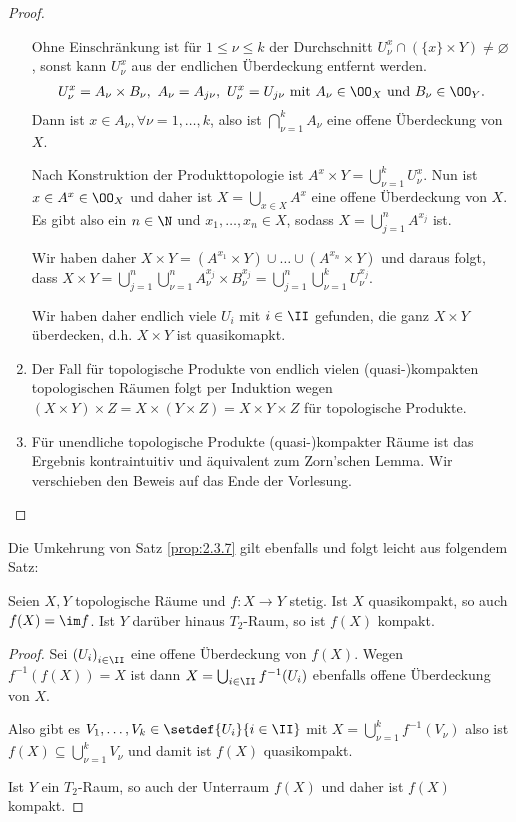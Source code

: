 \begin{proof}
\begin{enumerate}[label=\arabic{*}.)]
  Ohne Einschränkung ist für $1\le \nu\le k$ der Durchschnitt
  $U_\nu^x\cap\left(\{x\}\times Y\right)\neq\varnothing$, sonst kann $U_\nu^x$
  aus der endlichen Überdeckung entfernt werden.
\begin{align*}
U_\nu^x = A_\nu\times B_\nu,\
A_\nu = A_{j\nu},\ U_\nu^x = U_{j\nu}\text{ mit } A_\nu\in\OO_X \text{ und }B_\nu\in\OO_Y.
\end{align*}
  Dann ist $x\in A_\nu, \forall \nu=1,\ldots,k$, also ist $\bigcap_{\nu=1}^k
  A_\nu$ eine offene Überdeckung von $X$.
  
  Nach Konstruktion der Produkttopologie ist $A^x\times Y = \bigcup_{\nu=1}^k
  U_\nu^x$. Nun ist $x\in A^x\in\OO_X$ und daher ist $X=\bigcup_{x\in X} A^x$
  eine offene Überdeckung von $X$. Es gibt also ein $n\in\N$ und
  $x_1,\ldots,x_n\in X$, sodass $X=\bigcup_{j=1}^n A^{x_j}$ ist.
  
  Wir haben daher $X\times Y = \left(A^{x_1}\times Y\right) \cup \ldots\cup
  \left(A^{x_n}\times Y \right)$ und daraus folgt, dass
  $X\times Y = \bigcup_{j=1}^n\bigcup_{\nu=1}^n A_\nu^{x_j}\times B_\nu^{x_j} =
  \bigcup_{j=1}^n\bigcup_{\nu=1}^k U_\nu^{x_j}$.
  
  Wir haben daher endlich viele $U_i$ mit $i\in\II$ gefunden, die ganz $X\times
  Y$ überdecken, d.h. $X\times Y$ ist quasikomapkt.
  \item Der Fall für topologische Produkte von endlich vielen (quasi-)kompakten
  topologischen Räumen folgt per Induktion wegen $(X\times Y)\times Z = X\times
  (Y\times Z) = X\times Y\times Z$ für topologische Produkte.
  \item Für unendliche topologische Produkte (quasi-)kompakter Räume ist das
  Ergebnis kontraintuitiv und äquivalent zum Zorn'schen Lemma. Wir verschieben
  den Beweis auf das Ende der Vorlesung.\qedhere
\end{enumerate}
\end{proof}

Die Umkehrung von Satz \ref{prop:2.3.7} gilt ebenfalls und folgt leicht aus
folgendem Satz:
\begin{prop}
\label{prop:2.3.8}
Seien $X,Y$ topologische Räume und $f:X\to Y$ stetig. Ist $X$ quasikompakt, so
auch $f(X)=\im f$. Ist $Y$ darüber hinaus $T_2$-Raum, so ist $f(X)$
kompakt.\fishhere
\end{prop}
\begin{proof}
Sei $\left(U_i\right)_{i\in\II}$ eine offene Überdeckung von $f(X)$. Wegen
$f^{-1}(f(X)) = X$ ist dann $X=\bigcup_{i\in\II} f^{-1}(U_i)$ ebenfalls offene
Überdeckung von $X$.

Also gibt es $V_1,\ldots,V_k\in\setdef{U_i}{i\in\II}$ mit $X=\bigcup_{\nu=1}^k
f^{-1}(V_\nu)$ also ist $f(X)\subseteq \bigcup_{\nu=1}^k V_\nu$ und damit ist
$f(X)$ quasikompakt.

Ist $Y$ ein $T_2$-Raum, so auch der Unterraum $f(X)$ und daher ist $f(X)$
kompakt.\qedhere
\end{proof}

